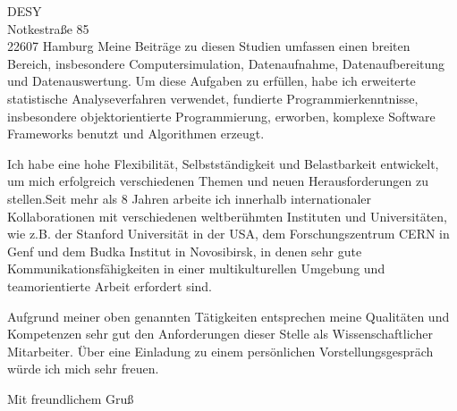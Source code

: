 \documentclass[ebner,paper=a4,fontsize=11pt,ngerman,BCOR=10mm]{scrlttr2}%
\begin{document}
\begin{letter}{DESY\\
Notkestra{\ss}e 85\\ 
22607 Hamburg}
Meine Beitr\"age zu diesen Studien umfassen einen breiten Bereich,
insbesondere Computersimulation, Datenaufnahme, Datenaufbereitung und
Datenauswertung. Um diese Aufgaben zu erf{\"u}llen, habe ich
erweiterte statistische Analyseverfahren verwendet, fundierte
Programmierkenntnisse, insbesondere objektorientierte Programmierung,
erworben, komplexe Software Frameworks benutzt und Algorithmen
erzeugt.


Ich habe eine hohe Flexibilit\"at, Selbstst\"andigkeit und
Belastbarkeit entwickelt, um mich erfolgreich verschiedenen Themen und
neuen Herausforderungen zu stellen.Seit mehr als 8 Jahren arbeite ich
innerhalb internationaler Kollaborationen mit verschiedenen
weltber\"uhmten Instituten und Universit{\"a}ten, wie z.B. der
Stanford Universit{\"a}t in der USA, dem Forschungszentrum CERN in Genf
und dem Budka Institut in Novosibirsk, in denen sehr gute
Kommunikationsf\"ahigkeiten in einer multikulturellen Umgebung und
teamorientierte Arbeit erfordert sind.


Aufgrund meiner oben genannten T\"atigkeiten entsprechen meine
Qualit\"aten und Kompetenzen sehr gut den Anforderungen dieser Stelle
als Wissenschaftlicher Mitarbeiter. \"Uber eine Einladung zu einem pers\"onlichen
Vorstellungsgespr\"ach w\"urde ich mich sehr freuen.

\closing{Mit freundlichem Gru\ss}
\enlargethispage{6\baselineskip}

\end{letter}
\end{document}
